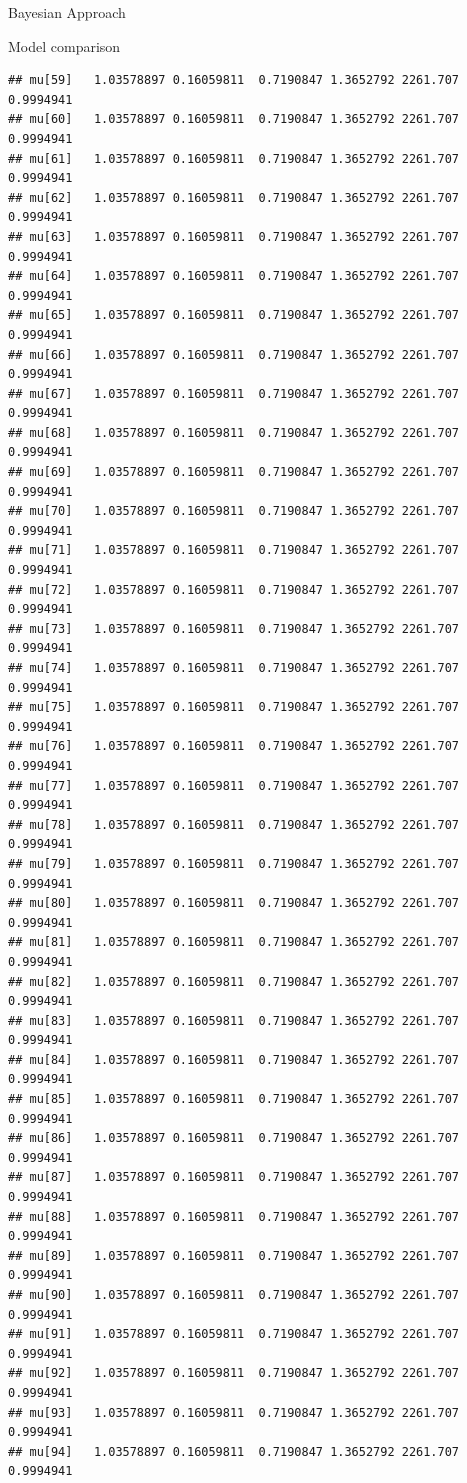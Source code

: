\documentclass[
  ignorenonframetext,
]{beamer}
\begin{document}
\begin{frame}[fragile]{Bayesian Approach}
\begin{block}{Model comparison}
\begin{verbatim}
## mu[59]   1.03578897 0.16059811  0.7190847 1.3652792 2261.707 0.9994941
## mu[60]   1.03578897 0.16059811  0.7190847 1.3652792 2261.707 0.9994941
## mu[61]   1.03578897 0.16059811  0.7190847 1.3652792 2261.707 0.9994941
## mu[62]   1.03578897 0.16059811  0.7190847 1.3652792 2261.707 0.9994941
## mu[63]   1.03578897 0.16059811  0.7190847 1.3652792 2261.707 0.9994941
## mu[64]   1.03578897 0.16059811  0.7190847 1.3652792 2261.707 0.9994941
## mu[65]   1.03578897 0.16059811  0.7190847 1.3652792 2261.707 0.9994941
## mu[66]   1.03578897 0.16059811  0.7190847 1.3652792 2261.707 0.9994941
## mu[67]   1.03578897 0.16059811  0.7190847 1.3652792 2261.707 0.9994941
## mu[68]   1.03578897 0.16059811  0.7190847 1.3652792 2261.707 0.9994941
## mu[69]   1.03578897 0.16059811  0.7190847 1.3652792 2261.707 0.9994941
## mu[70]   1.03578897 0.16059811  0.7190847 1.3652792 2261.707 0.9994941
## mu[71]   1.03578897 0.16059811  0.7190847 1.3652792 2261.707 0.9994941
## mu[72]   1.03578897 0.16059811  0.7190847 1.3652792 2261.707 0.9994941
## mu[73]   1.03578897 0.16059811  0.7190847 1.3652792 2261.707 0.9994941
## mu[74]   1.03578897 0.16059811  0.7190847 1.3652792 2261.707 0.9994941
## mu[75]   1.03578897 0.16059811  0.7190847 1.3652792 2261.707 0.9994941
## mu[76]   1.03578897 0.16059811  0.7190847 1.3652792 2261.707 0.9994941
## mu[77]   1.03578897 0.16059811  0.7190847 1.3652792 2261.707 0.9994941
## mu[78]   1.03578897 0.16059811  0.7190847 1.3652792 2261.707 0.9994941
## mu[79]   1.03578897 0.16059811  0.7190847 1.3652792 2261.707 0.9994941
## mu[80]   1.03578897 0.16059811  0.7190847 1.3652792 2261.707 0.9994941
## mu[81]   1.03578897 0.16059811  0.7190847 1.3652792 2261.707 0.9994941
## mu[82]   1.03578897 0.16059811  0.7190847 1.3652792 2261.707 0.9994941
## mu[83]   1.03578897 0.16059811  0.7190847 1.3652792 2261.707 0.9994941
## mu[84]   1.03578897 0.16059811  0.7190847 1.3652792 2261.707 0.9994941
## mu[85]   1.03578897 0.16059811  0.7190847 1.3652792 2261.707 0.9994941
## mu[86]   1.03578897 0.16059811  0.7190847 1.3652792 2261.707 0.9994941
## mu[87]   1.03578897 0.16059811  0.7190847 1.3652792 2261.707 0.9994941
## mu[88]   1.03578897 0.16059811  0.7190847 1.3652792 2261.707 0.9994941
## mu[89]   1.03578897 0.16059811  0.7190847 1.3652792 2261.707 0.9994941
## mu[90]   1.03578897 0.16059811  0.7190847 1.3652792 2261.707 0.9994941
## mu[91]   1.03578897 0.16059811  0.7190847 1.3652792 2261.707 0.9994941
## mu[92]   1.03578897 0.16059811  0.7190847 1.3652792 2261.707 0.9994941
## mu[93]   1.03578897 0.16059811  0.7190847 1.3652792 2261.707 0.9994941
## mu[94]   1.03578897 0.16059811  0.7190847 1.3652792 2261.707 0.9994941

\end{verbatim}
\end{block}
\end{frame}
\end{document}
